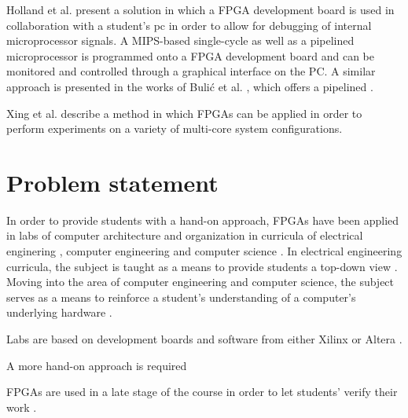 \documentclass[openright]{uva-bachelor-thesis}
\begin{document}
Holland et al. \cite{holland2003harnessing} present a solution in which a FPGA development board is used in collaboration with a student's pc in order to allow for debugging of internal microprocessor signals. A MIPS-based single-cycle as well as a pipelined microprocessor is programmed onto a FPGA development board and can be monitored and controlled through a graphical interface on the PC. A similar approach is presented in the works of Buli\'c et al. \cite{bulic2013fpga}, which offers a pipelined . 

Xing et al. \cite{xing2008fpga} describe a method in which FPGAs can be applied in order to perform experiments on a variety of multi-core system configurations. 

\section{Problem statement}
\label{sectionproblemstatement}

In order to provide students with a hand-on approach, FPGAs have been applied in labs of computer architecture and organization in curricula of electrical enginering \cite{jansen2014every, oztekin2011bzk, el2011teaching, pereira2012basic}, computer engineering \cite{cifredo2015computer, kellett2012project, el2011teaching, pereira2012basic, lee2012pipelined, oztekin2011bzk} and computer science \cite{bulic2013fpga, el2011teaching, pereira2012basic, lee2012pipelined}. In electrical engineering curricula, the subject is taught as a means to provide students a top-down view \cite{jansen2014every}. Moving into the area of computer engineering and computer science, the subject serves as a means to reinforce a student's understanding of a computer's underlying hardware \cite{cifredo2015computer, el2011teaching, lee2012pipelined}. 

Labs are based on development boards and software from either Xilinx \cite{al2007teaching, wang2011bridging, nakano2008processor, paharsingh2009novel, bulic2013fpga} or Altera \cite{xing2008fpga, oztekin2011bzk, lee2012pipelined, el2011teaching, kellett2012project, jansen2014every}.

 
A more hand-on approach is required \cite{cifredo2015computer, oztekin2011bzk}

FPGAs are used in a late stage of the course in order to let students' verify their work \cite{wang2011bridging}.
\end{document}
